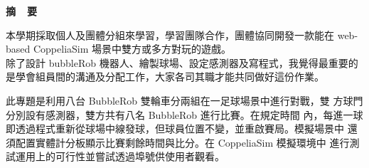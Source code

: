 \renewcommand{\baselinestretch}{1.5} %
\clearpage  %
\sectionef
{} %
\begin{center}
\LARGE\textbf{摘~~要}\\
\end{center}
\begin{flushleft}
\fontsize{14pt}{20pt}\sectionef\hspace{12pt}\quad 本學期採取個人及團體分組來學習，學習團隊合作，團體協同開發一款能在
web-based CoppeliaSim 場景中雙方或多方對玩的遊戲。
\\[12pt]

\fontsize{14pt}{20pt}\sectionef\hspace{12pt}\quad 除了設計 bubbleRob 機器人、繪製球場、設定感測器及寫程式，我覺得最重要的是學會組員間的溝通及分配工作，大家各司其職才能共同做好這份作業。\\[12pt]

\end{flushleft}
\begin{flushleft}
\fontsize{14pt}{20pt}\selectfont 此專題是利用八台 BubbleRob 雙輪車分兩組在一足球場景中進行對戰，雙
方球門分別設有感測器，雙方共有八名 BubbleRob 進行比賽。在規定時間
內，每進一球即透過程式重新從球場中線發球，但球員位置不變，並重啟賽局。模擬場景中
還須配置實體計分板顯示比賽剩餘時間與比分。在 CoppeliaSim 模擬環境中
進行測試運用上的可行性並嘗試透過埠號供使用者觀看。
\end{flushleft}
\newpage
\renewcommand{\baselinestretch}{1.5} %
